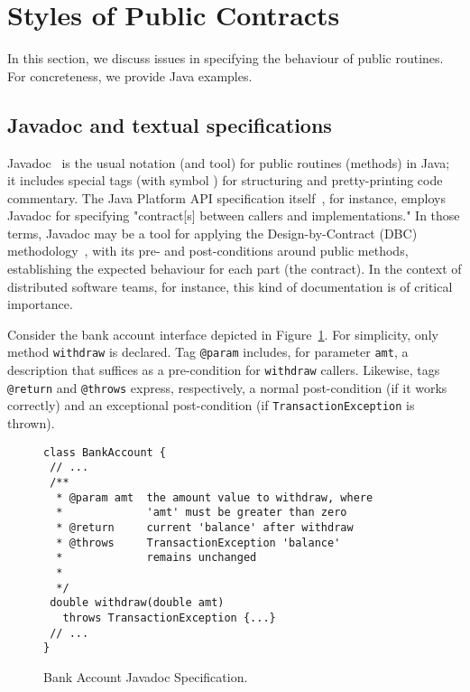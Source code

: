 \section{Styles of Public Contracts}
\label{sec:example}

In this section, we discuss issues in specifying the behaviour of public routines. For concreteness, we provide Java examples.

\subsection{Javadoc and textual specifications}

Javadoc~\cite{javadoc-oracle} is the usual notation (and tool) for public routines (methods) in Java; it includes special tags (with symbol \@) for structuring and pretty-printing code commentary.
The Java Platform API specification itself~\cite{java-spec}, for instance, employs Javadoc for specifying "contract[s] between callers and implementations."
In those terms, Javadoc may be a tool for applying the Design-by-Contract (DBC) methodology~\cite{dbc}, with its pre- and post-conditions around public methods, establishing the expected behaviour for each part (the contract). In the context of distributed software teams, for instance, this kind of documentation is of critical importance. 


Consider the bank account interface depicted in Figure~\ref{Fig-Javadoc-Bank}. For simplicity, only method {\lstinline!withdraw!} is declared. Tag \lstinline!@param! includes, for parameter \lstinline!amt!, a description that suffices as a pre-condition for \lstinline!withdraw! callers. Likewise, tags \lstinline!@return! and \lstinline!@throws! express, respectively, a normal post-condition (if it works correctly) and an exceptional post-condition (if \lstinline!TransactionException! is thrown).


\begin{figure}
\centering
\begin{lstlisting}[basicstyle=\footnotesize\ttfamily,name=figxpi]
class BankAccount {
 // ...
 /**
  * @param amt  the amount value to withdraw, where
  *             'amt' must be greater than zero 
  * @return     current 'balance' after withdraw
  * @throws     TransactionException 'balance' 
  *             remains unchanged
  *
  */
 double withdraw(double amt) 
   throws TransactionException {...}
 // ...
}
\end{lstlisting}
\caption{Bank Account Javadoc Specification.}
\label{Fig-Javadoc-Bank}
\end{figure}


